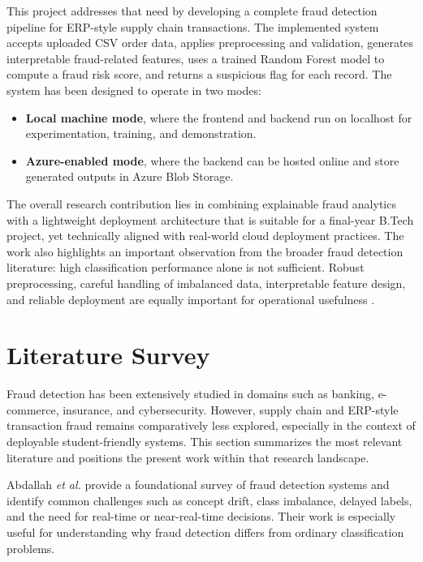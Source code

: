 \documentclass[a4paper,12pt]{article}
\begin{document}
This project addresses that need by developing a complete fraud detection pipeline for ERP-style supply chain transactions. The implemented system accepts uploaded CSV order data, applies preprocessing and validation, generates interpretable fraud-related features, uses a trained Random Forest model to compute a fraud risk score, and returns a suspicious flag for each record. The system has been designed to operate in two modes:
\begin{itemize}[noitemsep]
    \item \textbf{Local machine mode}, where the frontend and backend run on localhost for experimentation, training, and demonstration.
    \item \textbf{Azure-enabled mode}, where the backend can be hosted online and store generated outputs in Azure Blob Storage.
\end{itemize}

The overall research contribution lies in combining explainable fraud analytics with a lightweight deployment architecture that is suitable for a final-year B.Tech project, yet technically aligned with real-world cloud deployment practices. The work also highlights an important observation from the broader fraud detection literature: high classification performance alone is not sufficient. Robust preprocessing, careful handling of imbalanced data, interpretable feature design, and reliable deployment are equally important for operational usefulness \cite{abdallah2016survey,sorournejad2016survey,ahmed2016anomaly,sulaiman2022review}.

\section{Literature Survey}
Fraud detection has been extensively studied in domains such as banking, e-commerce, insurance, and cybersecurity. However, supply chain and ERP-style transaction fraud remains comparatively less explored, especially in the context of deployable student-friendly systems. This section summarizes the most relevant literature and positions the present work within that research landscape.

Abdallah \textit{et al.} \cite{abdallah2016survey} provide a foundational survey of fraud detection systems and identify common challenges such as concept drift, class imbalance, delayed labels, and the need for real-time or near-real-time decisions. Their work is especially useful for understanding why fraud detection differs from ordinary classification problems.
\end{document}
